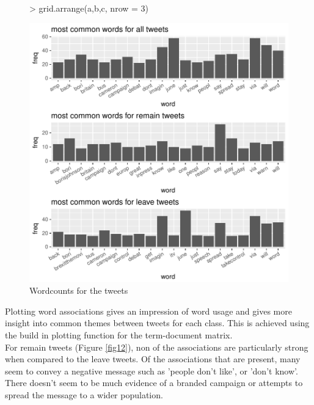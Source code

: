 \documentclass[10pt]{article}
\begin{document}
\begin{figure}[H]
\begin{center}
\begin{Schunk}
\begin{Sinput}
> grid.arrange(a,b,c, nrow = 3)
\end{Sinput}
\end{Schunk}
\includegraphics{submission-032}
\caption {Wordcounts for the tweets}
\label{fig10}
\end {center}
\end {figure}

Plotting word associations gives an impression of word usage and gives more insight into common themes between tweets for each class. This is achieved using the build in plotting function for the term-document matrix.\\
For remain tweets (Figure \ref{fig12}), non of the associations are particularly strong when compared to the leave tweets. Of the associations that are present, many seem to convey a negative message such as 'people don't like', or 'don't know'. There doesn't seem to be much evidence of a branded campaign or attempts to spread the message to a wider population.
\end{document}

